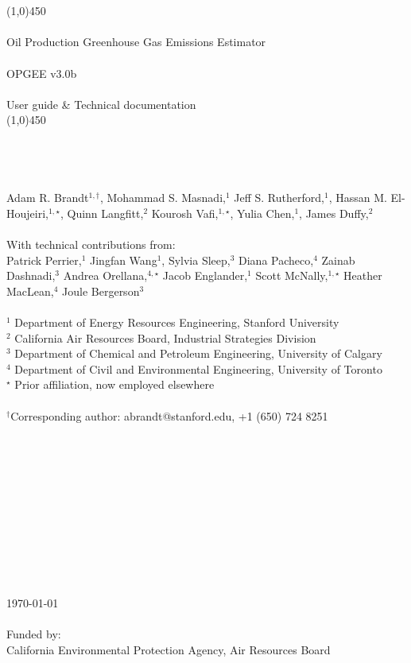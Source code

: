 \documentclass[11pt]{report}
\newcommand{\arbtitle}[1]{\textrm{\Large{#1}}}
\newcommand{\version}{v3.0b }
\begin{document}
\thispagestyle{plain}
\noindent \arbtitle{\\
\\
\linethickness{0.6mm} \line(1,0){450}\\
\\
{{\textcolor{stanford}{Oil Production Greenhouse Gas Emissions Estimator \\
\\
OPGEE \version \;\\ 
\\
\large{User guide \& Technical documentation} }}}}
\\
\linethickness{0.6mm} \line(1,0){450}\\
\\
\\
\noindent 
\textrm{\\
\\
Adam R. Brandt$^{1,\dagger}$, Mohammad S. Masnadi,$^1$ Jeff S. Rutherford,$^1$, Hassan M. El-Houjeiri,$^{1,\star}$, Quinn Langfitt,$^2$ Kourosh Vafi,$^{1,\star}$, Yulia Chen,$^1$, James Duffy,$^2$ \\
\\
With technical contributions from:\\
Patrick Perrier,$^{1}$ Jingfan Wang$^1$, Sylvia Sleep,$^3$  Diana Pacheco,$^4$ Zainab Dashnadi,$^3$ Andrea Orellana,$^{4,\star}$ Jacob Englander,$^1$ Scott McNally,$^{1,\star}$ Heather MacLean,$^4$ Joule Bergerson$^3$\\
\\
$^1$ Department of Energy Resources Engineering, Stanford University \\
$^2$ California Air Resources Board, Industrial Strategies Division\\
$^3$ Department of Chemical and Petroleum Engineering, University of Calgary\\
$^4$ Department of Civil and Environmental Engineering, University of Toronto\\
$^\star$ Prior affiliation, now employed elsewhere
\\
\\
$^{\dagger}$Corresponding author: abrandt@stanford.edu, +1 (650) 724 8251
\\
\\
\\
\\
\\
\\
\\
\\
\\
\\
\\
\\
\today \\
\\
Funded by:\\
California Environmental Protection Agency, Air Resources Board}
\end{document}
